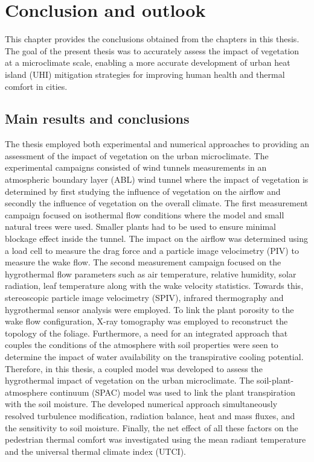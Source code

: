 \chapter{Conclusion and outlook}
\label{ch:conclusions}

This chapter provides the conclusions obtained from the chapters in this thesis. The goal of the present thesis was to accurately assess the impact of vegetation at a microclimate scale, enabling a more accurate development of urban heat island (UHI) mitigation strategies for improving human health and thermal comfort in cities.

\section{Main results and conclusions}

The thesis employed both experimental and numerical approaches to providing an assessment of the impact of vegetation on the urban microclimate. The experimental campaigns consisted of wind tunnels measurements in an atmospheric boundary layer (ABL) wind tunnel where the impact of vegetation is determined by first studying the influence of vegetation on the airflow and secondly the influence of vegetation on the overall climate. The first measurement campaign focused on isothermal flow conditions where the model and small natural trees were used. Smaller plants had to be used to ensure minimal blockage effect inside the tunnel. The impact on the airflow was determined using a load cell to measure the drag force and a particle image velocimetry (PIV) to measure the wake flow. The second measurement campaign focused on the hygrothermal flow parameters such as air temperature, relative humidity, solar radiation, leaf temperature along with the wake velocity statistics. Towards this, stereoscopic particle image velocimetry (SPIV), infrared thermography and hygrothermal sensor analysis were employed. To link the plant porosity to the wake flow configuration, X-ray tomography was employed to reconstruct the topology of the foliage. Furthermore, a need for an integrated approach that couples the conditions of the atmosphere with soil properties were seen to determine the impact of water availability on the transpirative cooling potential. Therefore, in this thesis, a coupled model was developed to assess the hygrothermal impact of vegetation on the urban microclimate. The soil-plant-atmosphere continuum (SPAC) model was used to link the plant transpiration with the soil moisture. The developed numerical approach simultaneously resolved turbulence modification, radiation balance, heat and mass fluxes, and the sensitivity to soil moisture. Finally, the net effect of all these factors on the pedestrian thermal comfort was investigated using the mean radiant temperature and the universal thermal climate index (UTCI).

